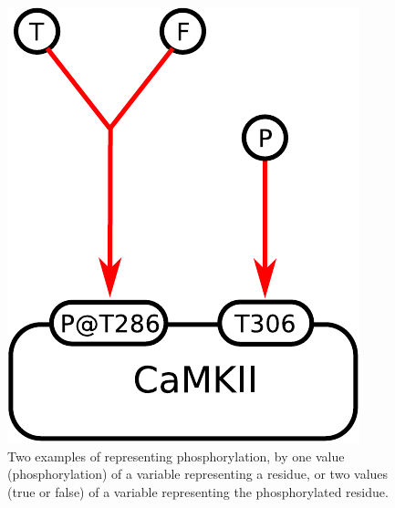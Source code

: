 \begin{figure}[H]
  \centering
  \includegraphics[scale = 0.5]{examples/ex-assignment}
  \caption{Two examples of  representing phosphorylation, by one value (phosphorylation) of a variable representing a residue, or two values (true or false) of a variable representing the phosphorylated residue.}
  \label{fig:ex-assignment}
\end{figure}


